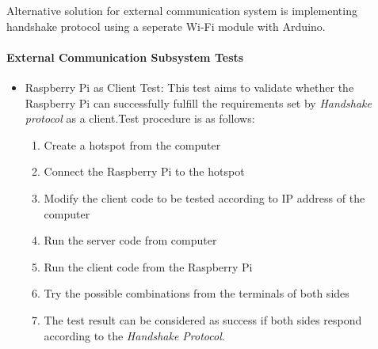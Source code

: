 \documentclass[a4paper,12pt]{article}
\begin{document}
	Alternative solution for external communication system is implementing handshake protocol using a seperate Wi-Fi module with Arduino.
	\paragraph{External Communication Subsystem Tests}
		
		\begin{itemize}
		
		\item Raspberry Pi as Client Test:
			This test aims to validate whether the Raspberry Pi can successfully fulfill the requirements set by \textit{Handshake protocol} as a client.Test procedure is as follows:
			\begin{enumerate}
				\item Create a hotspot from the computer \vspace{-0.2cm}
				\item Connect the Raspberry Pi to the hotspot \vspace{-0.2cm}
				\item Modify the client code to be tested according to IP address of the computer
				\item Run the server code from computer \vspace{-0.2cm}
				\item Run the client code from the Raspberry Pi \vspace{-0.2cm}
				\item Try the possible combinations from the terminals of both sides \vspace{-0.2cm}
				\item The test result can be considered as success if both sides respond according to the \textit{Handshake Protocol}.
			\end{enumerate}		
		

\end{itemize}
\end{document}
